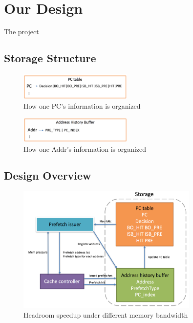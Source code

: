 \section{Our Design}
\label{sec:ourdesign}

The project

  \subsection{Storage Structure}
  \label{sec:storestruct}
  \begin{figure}[ht!]
	   \centering
	   \includegraphics[width=0.5\textwidth]{images/pc_table.png}
	   \caption{How one PC's information is organized}
	   \label{fig:pc_table}
  \end{figure}

  \begin{figure}[ht!]
	   \centering
	   \includegraphics[width=0.5\textwidth]{images/address_buf.png}
	   \caption{How one Addr's information is organized}
	   \label{fig:address_buf}
  \end{figure}

  \subsection{Design Overview}
  \label{sec:dynamicdesignoverview}
  \begin{figure}[ht!]
	   \centering
	   \includegraphics[width=0.8\textwidth]{images/dynamic_design.png}
	   \caption{Headroom speedup under different memory bandwidth}
	   \label{fig:dynamic_design}
  \end{figure}
